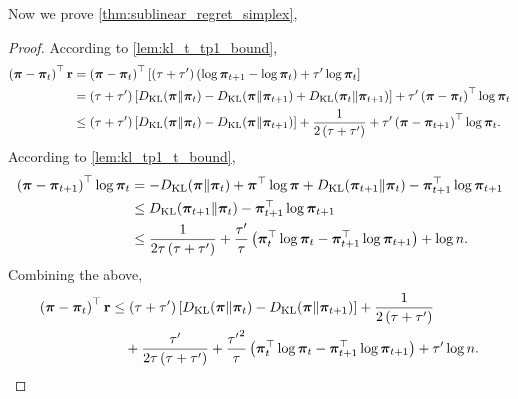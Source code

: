 Now we prove \cref{thm:sublinear_regret_simplex},
\begin{proof}
According to \cref{lem:kl_t_tp1_bound},
\begin{equation*}
\begin{split}
    \left( {\boldsymbol{\pi}} - {\boldsymbol{\pi}}_t \right)^\top {\mathbf{r}} &= \left( {\boldsymbol{\pi}} - {\boldsymbol{\pi}}_t \right)^\top \left[ \left(\tau + \tau^\prime\right) \left( \log{{\boldsymbol{\pi}}_{t+1}} - \log{{\boldsymbol{\pi}}_t} \right) + \tau^\prime \log{{\boldsymbol{\pi}}_t} \right] \\
    &= \left(\tau + \tau^\prime\right) \left[ D_{\mathrm{KL}}{\left( {\boldsymbol{\pi}} \middle\| {\boldsymbol{\pi}}_t \right)} - D_{\mathrm{KL}}{\left( {\boldsymbol{\pi}} \middle\| {\boldsymbol{\pi}}_{t+1} \right)} + D_{\mathrm{KL}}{\left( {\boldsymbol{\pi}}_t \middle\| {\boldsymbol{\pi}}_{t+1} \right)}  \right] + \tau^\prime \left( {\boldsymbol{\pi}} - {\boldsymbol{\pi}}_t \right)^\top \log{{\boldsymbol{\pi}}_t} \\
    &\le \left(\tau + \tau^\prime\right) \left[ D_{\mathrm{KL}}{\left( {\boldsymbol{\pi}} \middle\| {\boldsymbol{\pi}}_t \right)} - D_{\mathrm{KL}}{\left( {\boldsymbol{\pi}} \middle\| {\boldsymbol{\pi}}_{t+1} \right)} \right] + \frac{1}{2\left(\tau + \tau^\prime\right)} + \tau^\prime \left( {\boldsymbol{\pi}} - {\boldsymbol{\pi}}_{t+1} \right)^\top \log{{\boldsymbol{\pi}}_t}.
\end{split}
\end{equation*}
According to \cref{lem:kl_tp1_t_bound},
\begin{equation*}
\begin{split}
    \left( {\boldsymbol{\pi}} - {\boldsymbol{\pi}}_{t+1} \right)^\top \log{{\boldsymbol{\pi}}_t} &= - D_{\mathrm{KL}}{\left( {\boldsymbol{\pi}} \middle\| {\boldsymbol{\pi}}_t \right)} + {\boldsymbol{\pi}}^\top \log{{\boldsymbol{\pi}}} + D_{\mathrm{KL}}{\left( {\boldsymbol{\pi}}_{t+1} \middle\| {\boldsymbol{\pi}}_t \right)} - {\boldsymbol{\pi}}_{t+1}^\top \log{{\boldsymbol{\pi}}_{t+1}} \\
    &\le D_{\mathrm{KL}}{\left( {\boldsymbol{\pi}}_{t+1} \middle\| {\boldsymbol{\pi}}_t \right)} - {\boldsymbol{\pi}}_{t+1}^\top \log{{\boldsymbol{\pi}}_{t+1}} \\
    &\le \frac{1}{2\tau \left(\tau + \tau^\prime\right)} + \frac{\tau^\prime}{\tau} \left( {\boldsymbol{\pi}}_t^\top \log{{\boldsymbol{\pi}}_t} -  {\boldsymbol{\pi}}_{t+1}^\top \log{{\boldsymbol{\pi}}_{t+1}}  \right) + \log{n}.
\end{split}
\end{equation*}
Combining the above,
\begin{equation*}
\begin{split}
    \left( \rvpi - \rvpi_t \right)^\top \rvr &\le \left(\tau + \tau^\prime\right) \left[ \KL{\left( \rvpi \middle\| \rvpi_t \right)} - \KL{\left( \rvpi \middle\| \rvpi_{t+1} \right)} \right] + \frac{1}{2\left(\tau + \tau^\prime\right)} \\
    &\quad + \frac{\tau^\prime}{2\tau \left(\tau + \tau^\prime\right)} + \frac{{\tau^\prime}^2}{\tau} \left( \rvpi_t^\top \log{\rvpi_t} -  \rvpi_{t+1}^\top \log{\rvpi_{t+1}}  \right) + \tau^\prime \log{n}.

\end{split}
\end{equation*}
\end{proof}
